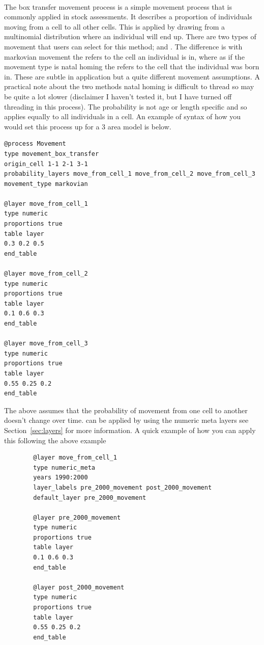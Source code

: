 \paragraph{}\label{subsubsec:box_transfer}
The box transfer movement process is a simple movement process that is commonly applied in stock assessments. It describes a proportion of individuals moving from a cell to all other cells. This is applied by drawing from a multinomial distribution where an individual will end up. There are two types of movement that users can select for this method;  and . The difference is with markovian movement the  refers to the cell an individual is in, where as if the movement type is natal homing the  refers to the cell that the individual was born in. These are subtle in application but a quite different movement assumptions. A practical note about the two methods natal homing is difficult to thread so may be quite a lot slower (disclaimer I haven't tested it, but I have turned off threading in this process). The probability is not age or length specific and so applies equally to all individuals in a cell. An example of syntax of how you would set this process up for a 3 area model is below.


{\small{\begin{verbatim}
@process Movement
type movement_box_transfer
origin_cell 1-1 2-1 3-1
probability_layers move_from_cell_1 move_from_cell_2 move_from_cell_3
movement_type markovian

@layer move_from_cell_1
type numeric
proportions true
table layer
0.3 0.2 0.5
end_table

@layer move_from_cell_2
type numeric
proportions true
table layer
0.1 0.6 0.3
end_table

@layer move_from_cell_3
type numeric
proportions true
table layer
0.55 0.25 0.2
end_table

\end{verbatim}}}

The above assumes that the probability of movement from one cell to another doesn't change over time.  can be applied by using the numeric meta layers see Section~\ref{sec:layers} for more information. A quick example of how you can apply this following the above example

{\small{\begin{verbatim}
		@layer move_from_cell_1
		type numeric_meta
		years 1990:2000
		layer_labels pre_2000_movement post_2000_movement
		default_layer pre_2000_movement
		
		@layer pre_2000_movement
		type numeric
		proportions true
		table layer
		0.1 0.6 0.3
		end_table
		
		@layer post_2000_movement
		type numeric
		proportions true
		table layer
		0.55 0.25 0.2
		end_table
		\end{verbatim}}}


